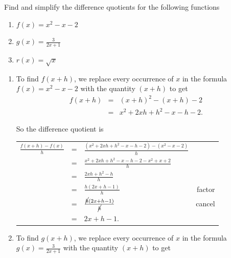 \documentclass{ximera}
\begin{document}
\begin{example} \label{differencequotientex} Find and simplify the difference quotients for the following functions

\begin{enumerate}

\item  $f(x) = x^2-x-2$ 

\item  $g(x) = \frac{3}{2x+1}$

\item  $r(x) = \sqrt{x}$ 

\end{enumerate}

\begin{explanation}
 
\begin{enumerate}

\item To find $f(x+h)$, we replace every occurrence of $x$ in the formula $f(x) = x^2-x-2$ with the quantity $(x+h)$ to get \[ \begin{array}{rclr}  
 
 f(x+h) & = & (x+h)^2 - (x+h) -2 & \\ 
 & = & x^2 + 2xh + h^2 - x - h - 2.
 \end{array} \]

So the difference quotient is

\setlength{\extrarowheight}{12pt}

\begin{longtable}{rclr}  

$\frac{f(x+h)-f(x)}{h}$ & = & $\frac{\left(x^2+2xh+h^2-x-h-2 \right)-\left(x^{2}-x-2 \right)}{h}$ & \\[8pt] 
& = & $\frac{x^2+2xh+h^2-x-h-2-x^2+x+2}{h}$ & \\ [8pt]
& = & $\frac{2xh+h^2-h}{h}$ & \\ [8pt]
& = & $\frac{h \left(2x+h-1\right)}{h}$ & factor \\ [8pt]
& = & $\frac{\cancel{h} \left(2x+h-1\right)}{\cancel{h}}$ & cancel \\ [8pt]
& = & $2x+h-1$. \\

\end{longtable} 

\item To find $g(x+h)$, we replace every occurrence of $x$ in the formula $g(x) = \frac{3}{2x+1}$ with the quantity $(x+h)$ to get 


\end{enumerate}
\end{explanation}
\end{example}
\end{document}
